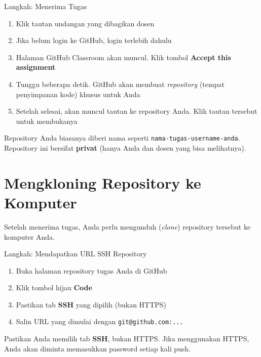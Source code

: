 \documentclass[
    a4paper,
    11pt,
    parskip=half
]{scrartcl}
\begin{document}
\begin{stepbox}{Langkah: Menerima Tugas}
\begin{enumerate}
    \item Klik tautan undangan yang dibagikan dosen
    \item Jika belum login ke GitHub, login terlebih dahulu
    \item Halaman GitHub Classroom akan muncul. Klik tombol \textbf{Accept this assignment}
    \item Tunggu beberapa detik. GitHub akan membuat \textit{repository} (tempat penyimpanan kode) khusus untuk Anda
    \item Setelah selesai, akan muncul tautan ke repository Anda. Klik tautan tersebut untuk membukanya
\end{enumerate}
\end{stepbox}

\begin{notebox}
Repository Anda biasanya diberi nama seperti \texttt{nama-tugas-username-anda}. Repository ini bersifat \textbf{privat} (hanya Anda dan dosen yang bisa melihatnya).
\end{notebox}

\section{Mengkloning Repository ke Komputer}
\label{sec:clone}

Setelah menerima tugas, Anda perlu mengunduh (\textit{clone}) repository tersebut ke komputer Anda.

\begin{stepbox}{Langkah: Mendapatkan URL SSH Repository}
\begin{enumerate}
    \item Buka halaman repository tugas Anda di GitHub
    \item Klik tombol hijau \textbf{Code}
    \item Pastikan tab \textbf{SSH} yang dipilih (bukan HTTPS)
    \item Salin URL yang dimulai dengan \texttt{git@github.com:...}
\end{enumerate}
\end{stepbox}

\begin{warningbox}
Pastikan Anda memilih tab \textbf{SSH}, bukan HTTPS. Jika menggunakan HTTPS, Anda akan diminta memasukkan password setiap kali push.
\end{warningbox}
\end{document}
